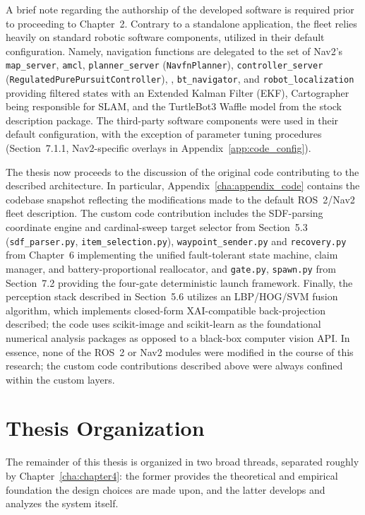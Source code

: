 A brief note regarding the authorship of the developed software is required prior to proceeding to Chapter~2. Contrary to a standalone application, the fleet relies heavily on standard robotic software components, utilized in their default configuration. Namely, navigation functions are delegated to the set of Nav2's \texttt{map\_server}, \texttt{amcl}, \texttt{planner\_server} (\texttt{NavfnPlanner}), \texttt{controller\_server} (\texttt{RegulatedPurePursuitController}), , \texttt{bt\_navigator}, and \texttt{robot\_localization} providing filtered states with an Extended Kalman Filter (EKF), Cartographer being responsible for SLAM, and the TurtleBot3 Waffle model from the stock description package. The third-party software components were used in their default configuration, with the exception of parameter tuning procedures (Section~7.1.1, Nav2-specific overlays in Appendix~\ref{app:code_config}).

The thesis now proceeds to the discussion of the original code contributing to the described architecture. In particular, Appendix~\ref{cha:appendix_code} contains the codebase snapshot reflecting the modifications made to the default ROS~2/Nav2 fleet description. The custom code contribution includes the SDF-parsing coordinate engine and cardinal-sweep target selector from Section~5.3 (\texttt{sdf\_parser.py}, \texttt{item\_selection.py}), \texttt{waypoint\_sender.py} and \texttt{recovery.py} from Chapter~6 implementing the unified fault-tolerant state machine, claim manager, and battery-proportional reallocator, and \texttt{gate.py}, \texttt{spawn.py} from Section~7.2 providing the four-gate deterministic launch framework. Finally, the perception stack described in Section~5.6 utilizes an LBP/HOG/SVM fusion algorithm, which implements closed-form XAI-compatible back-projection described; the code uses scikit-image and scikit-learn as the foundational numerical analysis packages as opposed to a black-box computer vision API. In essence, none of the ROS~2 or Nav2 modules were modified in the course of this research; the custom code contributions described above were always confined within the custom layers.

\section{Thesis Organization\label{sec:ch1_organization}}

The remainder of this thesis is organized in two broad threads, separated roughly by Chapter~\ref{cha:chapter4}: the former provides the theoretical and empirical foundation the design choices are made upon, and the latter develops and analyzes the system itself.

